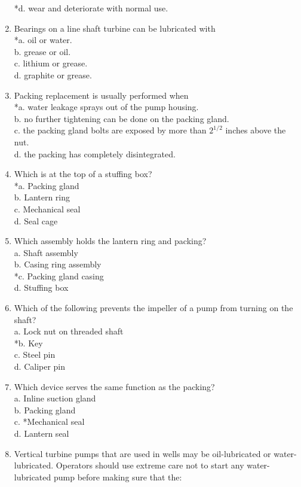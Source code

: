 \begin{enumerate}[1.]
*d. wear and deteriorate with normal use.\\
\item Bearings on a line shaft turbine can be lubricated with\\
*a. oil or water.\\
b. grease or oil.\\
c. lithium or grease.\\
d. graphite or grease.\\
\item Packing replacement is usually performed when\\
*a. water leakage sprays out of the pump housing.\\
b. no further tightening can be done on the packing gland.\\
c. the packing gland bolts are exposed by more than $2^{1 / 2}$ inches above the nut.\\
d. the packing has completely disintegrated.\\
\item Which is at the top of a stuffing box?\\
*a. Packing gland\\
b. Lantern ring\\
c. Mechanical seal\\
d. Seal cage\\
\item Which assembly holds the lantern ring and packing?\\
a. Shaft assembly\\
b. Casing ring assembly\\
*c. Packing gland casing\\
d. Stuffing box\\
\item Which of the following prevents the impeller of a pump from turning on the shaft?\\
a. Lock nut on threaded shaft\\
*b. Key\\
c. Steel pin\\
d. Caliper pin\\
\item Which device serves the same function as the packing?\\
a. Inline suction gland\\
b. Packing gland\\
c. *Mechanical seal\\
d. Lantern seal\\
\item Vertical turbine pumps that are used in wells may be oil-lubricated or water-lubricated. Operators should use extreme care not to start any water-lubricated pump before making sure that the:\\

\end{enumerate}
